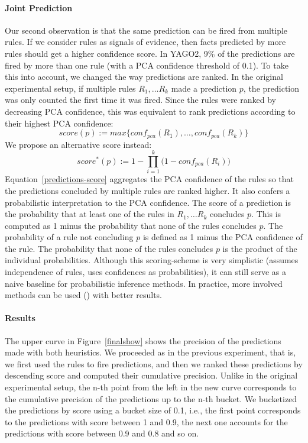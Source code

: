 \paragraph{Joint Prediction} Our second observation is that the same prediction can be fired from multiple rules. If we consider rules as signals of evidence,  
then facts predicted by more rules should get a higher confidence score. 
In YAGO2, 9\% of the predictions are fired by more than one rule (with a PCA confidence threshold of 0.1).  
To take this into account, we changed the way predictions are ranked. In the original experimental setup, if 
multiple rules $R_1, \dots R_k$ made a prediction $p$, the prediction was only counted the first time it was fired. 
Since the rules were ranked by decreasing PCA confidence, 
this was equivalent to rank predictions according to their highest PCA confidence: 
\[
 score(p) := max\{conf_{pca}(R_1), \dots, conf_{pca}(R_k) \}
\]
We propose an alternative score instead:
\begin{equation}\label{predictions-score}
 score^*(p) := 1 - \prod_{i = 1}^{k}{(1 -conf_{pca}(R_i)})
\end{equation}
Equation~\ref{predictions-score} aggregates the PCA confidence of the rules so that the predictions concluded by multiple rules
are ranked higher. It also confers a probabilistic interpretation to the PCA confidence. The score of a prediction
is the probability that at least one of the rules in $R_1, \dots R_k$ concludes $p$. This is computed as 1 minus the probability
that none of the rules concludes $p$. The probability of a rule not concluding $p$ is defined as 1 minus the PCA confidence of the rule.
The probability that none of the rules concludes $p$ is the product of the individual probabilities.
Although this scoring-scheme is very simplistic (assumes independence of rules, uses confidences as probabilities), it can still serve as  
a naive baseline for probabilistic inference methods. In practice, more involved methods can be used (\cite{markovlogic,urdf}) with better results.






\paragraph{Results} The upper curve in Figure~\ref{finalshow} shows the precision of the predictions made with both heuristics. 
We proceeded as in the previous experiment, that is,
we first used the rules to fire predictions, and then we ranked these predictions by descending score and computed their cumulative precision. 
Unlike in the original experimental setup, the n-th point from the left in the new curve corresponds to the cumulative precision
of the predictions up to the n-th bucket. We bucketized the predictions by score using a bucket size of 0.1, i.e., the first point
corresponds to the predictions with score between 1 and 0.9, the next one accounts for the predictions with score between 0.9 and 0.8 and so on.

